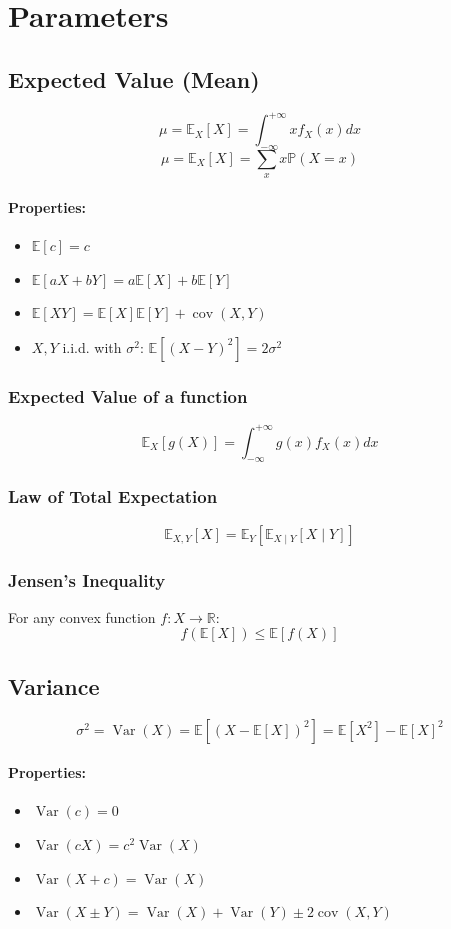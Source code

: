 \documentclass{article}
\begin{document}
\newpage
\section{Parameters}

\subsection{Expected Value (Mean)}
\[
    \mu = \mathbb{E}_X[X] = \int_{-\infty}^{+\infty} x f_X(x) dx
\]
\[
    \mu = \mathbb{E}_X[X] = \sum_{x} x \mathbb{P}(X=x)
\]
\paragraph{Properties:}
\begin{itemize}
    \item $ \mathbb{E}[c] = c $
    \item $ \mathbb{E}[aX+bY] = a\mathbb{E}[X] + b\mathbb{E}[Y] $
    \item $ \mathbb{E}[XY] = \mathbb{E}[X]\mathbb{E}[Y] + \operatorname{cov}(X,Y) $
    \item $ X, Y $ i.i.d. with $ \sigma^2 $: $ \mathbb{E}[(X-Y)^2] = 2\sigma^2 $
\end{itemize}

\subsubsection{Expected Value of a function}
\[
    \mathbb{E}_X[g(X)] = \int_{-\infty}^{+\infty} g(x)f_X(x)dx
\]

\subsubsection{Law of Total Expectation}
\[
    \mathbb{E}_{X,Y}[X] = \mathbb{E}_Y[\mathbb{E}_{X \mid Y}[X \mid Y]]
\]

\subsubsection{Jensen's Inequality}
For any convex function $f: X \to \mathbb{R}$:
\[
    f(\mathbb{E}[X]) \le \mathbb{E}[f(X)]
\]

\subsection{Variance}
\[
    \sigma^2 = \operatorname{Var}(X) = \mathbb{E}[(X - \mathbb{E}[X])^2] = \mathbb{E}[X^2] - \mathbb{E}[X]^2
\]
\paragraph{Properties:}
\begin{itemize}
    \item $ \operatorname{Var}(c) = 0 $
    \item $ \operatorname{Var}(cX) = c^2 \operatorname{Var}(X) $
    \item $ \operatorname{Var}(X+c) = \operatorname{Var}(X) $
    \item $ \operatorname{Var}(X \pm Y) = \operatorname{Var}(X) + \operatorname{Var}(Y) \pm 2\operatorname{cov}(X,Y) $
\end{itemize}
\end{document}
